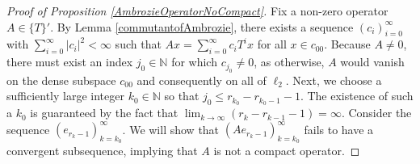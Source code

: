 \documentclass[a4paper,12pt]{article}
\theoremstyle{definition}
\numberwithin{equation}{section}
\numberwithin{thm}{section}
\newcommand{\N}{\mathbb{N}}
\begin{document}
\begin{proof}[Proof of Proposition \ref{AmbrozieOperatorNoCompact}]
Fix a non-zero operator $A\in \{T\}'$. By Lemma \ref{commutantofAmbrozie}, there exists a sequence $(c_i)_{i=0}^\infty$ with $\sum_{i=0}^\infty |c_i|^2 <\infty$ such that $Ax=\sum_{i=0}^\infty c_i T^i x$ for all $x\in c_{00}$. Because $A\neq 0$, there must exist an index $j_0 \in \N$ for which $c_{j_0} \neq 0$, as otherwise, $A$ would vanish on the dense subspace $c_{00}$ and consequently on all of $\ell_2$. Next, we choose a sufficiently large integer $k_0\in\N$ so that $j_0 \leq r_{k_0}- r_{k_0-1}-1$. The existence of such a $k_0$ is guaranteed by the fact that $\lim_{k \rightarrow\infty}(r_k - r_{k-1}-1)=\infty$. Consider the sequence $(e_{r_k-1})_{k=k_0}^\infty$. We will show that $(Ae_{r_k-1})_{k=k_0}^\infty$ fails to have a convergent subsequence, implying that $A$ is not a compact operator. 


\end{proof}
\end{document}
